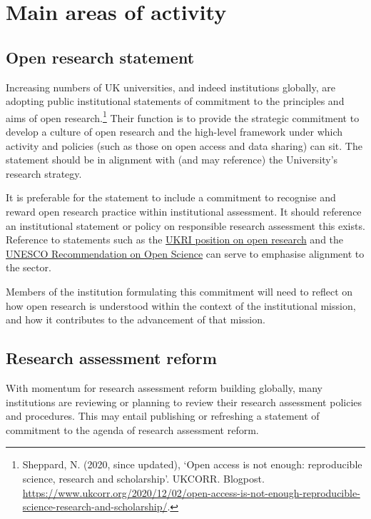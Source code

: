 \documentclass[
  letterpaper,
  DIV=11,
  numbers=noendperiod,
  oneside]{scrreprt}
\begin{document}
\section{Main areas of activity}\label{main-areas-of-activity}

\subsection{Open research statement}\label{open-research-statement}

Increasing numbers of UK universities, and indeed institutions globally,
are adopting public institutional statements of commitment to the
principles and aims of open research.\footnote{Sheppard, N. (2020, since
  updated), `Open access is not enough: reproducible science, research
  and scholarship'. UKCORR. Blogpost.
  \url{https://www.ukcorr.org/2020/12/02/open-access-is-not-enough-reproducible-science-research-and-scholarship/}.}
Their function is to provide the strategic commitment to develop a
culture of open research and the high-level framework under which
activity and policies (such as those on open access and data sharing)
can sit. The statement should be in alignment with (and may reference)
the University's research strategy.

It is preferable for the statement to include a commitment to recognise
and reward open research practice within institutional assessment. It
should reference an institutional statement or policy on responsible
research assessment this exists. Reference to statements such as the
\href{https://www.ukri.org/what-we-do/supporting-healthy-research-and-innovation-culture/open-research/}{UKRI
position on open research} and the
\href{https://www.unesco.org/en/open-science/about?hub=686}{UNESCO
Recommendation on Open Science} can serve to emphasise alignment to the
sector.

Members of the institution formulating this commitment will need to
reflect on how open research is understood within the context of the
institutional mission, and how it contributes to the advancement of that
mission.

\subsection{Research assessment
reform}\label{research-assessment-reform}

With momentum for research assessment reform building globally, many
institutions are reviewing or planning to review their research
assessment policies and procedures. This may entail publishing or
refreshing a statement of commitment to the agenda of research
assessment reform.
\end{document}
